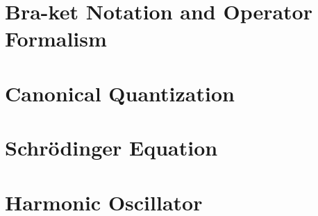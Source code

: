 \section{Bra-ket Notation and Operator Formalism}

\section{Canonical Quantization}

\section{Schrödinger Equation}

\section{Harmonic Oscillator}
